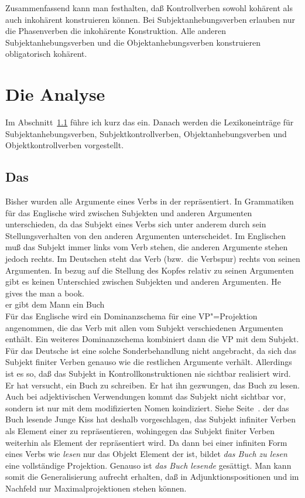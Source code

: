\noindent
Zusammenfassend kann man festhalten, daß Kontrollverben sowohl kohärent als auch inkohärent
konstruieren können. Bei Subjektanhebungsverben erlauben nur die Phasenverben die inkohärente
Konstruktion. Alle anderen Subjektanhebungsverben und die Objektanhebungsverben konstruieren obligatorisch
kohärent.


\section{Die Analyse}
\label{sec-anhebung-anal}

Im Abschnitt~\ref{sec-subj-merkmal} führe ich kurz das \subjm ein. Danach werden die Lexikoneinträge
für Subjektanhebungsverben, Subjektkontrollverben, Objektanhebungsverben und Objektkontrollverben
vorgestellt.

\subsection{Das \subjm}
\label{sec-subj-merkmal}

Bisher wurden alle Argumente eines Verbs in der \compsl repräsentiert.
In Grammatiken für das Englische wird zwischen Subjekten und anderen Argumenten
unterschieden, da das Subjekt eines Verbs sich unter anderem durch sein
Stellungsverhalten von den anderen Argumenten unterscheidet. Im Englischen
muß das Subjekt immer links vom Verb stehen, die anderen Argumente stehen
jedoch rechts. Im Deutschen steht das Verb (bzw.\ die Verbspur) rechts von seinen
Argumenten. In bezug auf die Stellung des Kopfes relativ zu seinen Argumenten
gibt es keinen Unterschied zwischen Subjekten und anderen Argumenten.
\ea
\gll He gives the man a book.\\
     er gibt dem Mann ein Buch\\
\z
Für das Englische wird ein Dominanzschema für eine VP"=Projektion
angenommen, die das Verb mit allen vom Subjekt verschiedenen Argumenten enthält.
Ein weiteres Dominanzschema kombiniert dann die VP mit dem Subjekt. Für das Deutsche
ist eine solche Sonderbehandlung nicht angebracht, da sich das Subjekt finiter Verben
genauso wie die restlichen Argumente verhält. Allerdings ist es so, daß das Subjekt
in Kontrollkonstruktionen nie sichtbar realisiert wird.
\eal
\ex Er hat versucht, ein Buch zu schreiben.
\ex Er hat ihn gezwungen, das Buch zu lesen.
\zl
Auch bei adjektivischen Verwendungen kommt das Subjekt nicht sichtbar
vor, sondern ist nur mit dem modifizierten Nomen koindiziert. Siehe Seite~\pageref{bsp-nominativ-adj}.
\ea
der das Buch lesende Junge
\z
Kiss \citeyearpar{Kiss92,Kiss95a} hat deshalb vorgeschlagen, das Subjekt infiniter
Verben als Element einer \subjl zu repräsentieren, wohingegen das Subjekt
finiter Verben weiterhin als Element der \compsl repräsentiert wird. Da dann
bei einer infiniten Form eines Verbs wie \emph{lesen} nur das Objekt Element
der \compsl ist, bildet \emph{das Buch zu lesen} eine vollständige Projektion.
Genauso ist \emph{das Buch lesende} gesättigt.
Man kann somit die Generalisierung aufrecht erhalten, daß in Adjunktionspositionen
und im Nachfeld nur Maximalprojektionen stehen können. 

